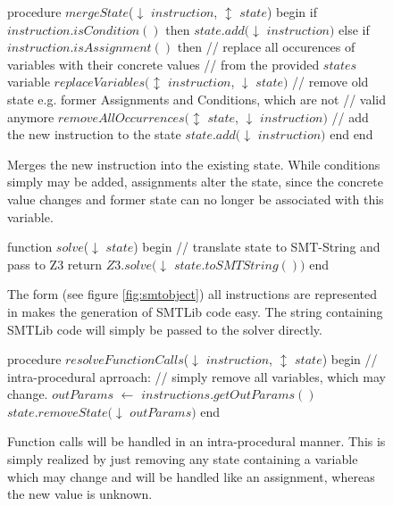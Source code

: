 \begin{figure}[h!]
	\begin{GenericCode}
	procedure $mergeState$($\downarrow$ $instruction$, $\updownarrow$ $state$) begin
		if $instruction.isCondition()$ then
			$state.add($$\downarrow$ $instruction$$)$
		else if $instruction.isAssignment()$ then
			// replace all occurences of variables with their concrete values
			// from the provided $states$ variable
			$replaceVariables($$\updownarrow$ $instruction$, $\downarrow$ $state$$)$ 
			// remove old state e.g. former Assignments and Conditions, which are not
			// valid anymore
			$removeAllOccurrences($$\updownarrow$ $state$, $\downarrow$ $instruction$$)$
			// add the new instruction to the state
			$state.add($$\downarrow$ $instruction$$)$
		end 
	end		
	\end{GenericCode}
	\caption{Merges the new instruction into the existing state. While conditions simply may be added, assignments alter the state, since the concrete value changes and former state can no longer be associated with this variable. }
\label{code:merge state}
\end{figure}
\begin{figure}[h!]
	\begin{GenericCode}
	function $solve$($\downarrow$ $state$) begin
		// translate state to SMT-String and pass to Z3
		return $Z3.solve($$\downarrow$ $state.toSMTString())$
	end
	\end{GenericCode}
	\caption{The form (see figure \ref{fig:smtobject}) all instructions are represented in makes the generation of SMTLib code easy. The string containing SMTLib code will simply be passed to the solver directly.}
\label{code:z3 solver}
\end{figure}
\begin{figure}[h!]
	\begin{GenericCode}
	procedure $resolveFunctionCalls$($\downarrow$ $instruction$, $\updownarrow$ $state$) begin
		// intra-procedural aprroach:
		// simply remove all variables, which may change.
		$outParams$ $\leftarrow$ $instructions.getOutParams()$
		$state.removeState($$\downarrow$ $outParams$$)$
	end		
	\end{GenericCode}
	\caption{Function calls will be handled in an intra-procedural manner. This is simply realized by just removing any state containing a variable which may change and will be handled like an assignment, whereas the new value is unknown. }
	\label{code:intraprocedural analysis}
\end{figure}
